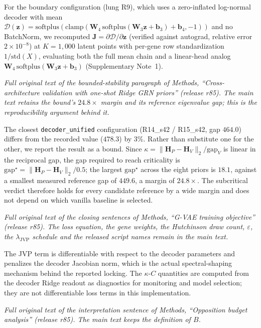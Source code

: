 \documentclass[11 pt,a4 paper]{article}
\newcommand{\Hmat}{\mathbf{H}}\newcommand{\Wmat}{\mathbf{W}}\newcommand{\Jmat}{\mathbf{J}}
\begin{document}
For the boundary configuration (lung R9), which uses a zero-inflated log-normal decoder with mean $\mathcal{D}(\mathbf{z}) = \mathrm{softplus}(\mathrm{clamp}(\mathbf{W}_4\,\mathrm{softplus}(\mathbf{W}_3\mathbf{z}+\mathbf{b}_3)+\mathbf{b}_4, -1))$ and no BatchNorm, we recomputed $\mathbf{J}=\partial\mathcal{D}/\partial\mathbf{z}$ (verified against autograd, relative error $2\times10^{-8}$) at $K=1{,}000$ latent points with per-gene row standardization $1/\mathrm{std}(X)$, evaluating both the full mean chain and a linear-head analog $\mathbf{W}_4\,\mathrm{softplus}(\mathbf{W}_3\mathbf{z}+\mathbf{b}_3)$ (Supplementary Note~1).

\noindent\emph{Full original text of the bounded-stability paragraph of Methods, ``Cross-architecture validation with one-shot Ridge GRN priors'' (release r85). The main text retains the bound's $24.8\times$ margin and its reference eigenvalue gap; this is the reproducibility argument behind it.}

The closest \texttt{decoder\_unified} configuration (R14\_s42 / R15\_s42, gap $464.0$) differs from the recorded value ($478.3$) by $3\%$. Rather than substitute one for the other, we report the result as a bound. Since $\kappa=\|\Hmat_P-\Hmat_V\|_2/\mathrm{gap}_V$ is linear in the reciprocal gap, the gap required to reach criticality is $\mathrm{gap}^\star=\|\Hmat_P-\Hmat_V\|_2/0.5$; the largest $\mathrm{gap}^\star$ across the eight priors is $18.1$, against a smallest measured reference gap of $449.6$, a margin of $24.8\times$. The subcritical verdict therefore holds for every candidate reference by a wide margin and does not depend on which vanilla baseline is selected.

\noindent\emph{Full original text of the closing sentences of Methods, ``G-VAE training objective'' (release r85). The loss equation, the gene weights, the Hutchinson draw count, $\varepsilon$, the $\lambda_{\mathrm{JVP}}$ schedule and the released script names remain in the main text.}

The JVP term is differentiable with respect to the decoder parameters and penalizes the decoder Jacobian norm, which is the actual spectral-shaping mechanism behind the reported locking. The $\kappa$-$C$ quantities are computed from the decoder Ridge readout as diagnostics for monitoring and model selection; they are not differentiable loss terms in this implementation.

\noindent\emph{Full original text of the interpretation sentence of Methods, ``Opposition budget analysis'' (release r85). The main text keeps the definition of $B$.}
\end{document}
